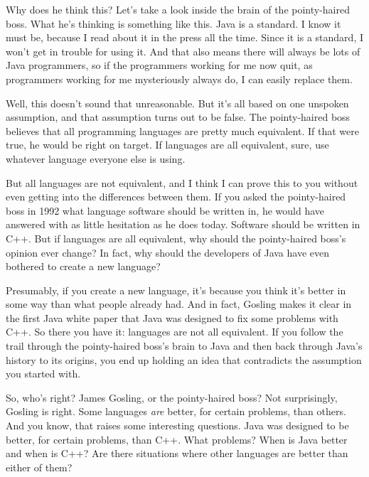 Why does he
                  think this? Let's take a look inside the brain of the
                  pointy-haired boss. What he's thinking is something like this.
                  Java is a standard. I know it must be, because I read about it
                  in the press all the time. Since it is a standard, I won't get
                  in trouble for using it. And that also means there will always
                  be lots of Java programmers, so if the programmers working for
                  me now quit, as programmers working for me mysteriously always
                  do, I can easily replace them.

Well, this doesn't
                  sound that unreasonable. But it's all based on one unspoken
                  assumption, and that assumption turns out to be false. The
                  pointy-haired boss believes that all programming languages are
                  pretty much equivalent. If that were true, he would be right
                  on target. If languages are all equivalent, sure, use whatever
                  language everyone else is using.

But all languages
                  are not equivalent, and I think I can prove this to you
                  without even getting into the differences between them. If you
                  asked the pointy-haired boss in 1992 what language software
                  should be written in, he would have answered with as little
                  hesitation as he does today. Software should be written in
                  C++. But if languages are all equivalent, why should the
                  pointy-haired boss's opinion ever change? In fact, why should
                  the developers of Java have even bothered to create a new
                  language?

Presumably, if you create a new language,
                  it's because you think it's better in some way than what
                  people already had. And in fact, Gosling makes it clear in the
                  first Java white paper that Java was designed to fix some
                  problems with C++. So there you have it: languages are not all
                  equivalent. If you follow the trail through the pointy-haired
                  boss's brain to Java and then back through Java's history to
                  its origins, you end up holding an idea that contradicts the
                  assumption you started with.

So, who's right? James
                  Gosling, or the pointy-haired boss? Not surprisingly, Gosling
                  is right. Some languages \emph{are} better, for certain
                  problems, than others. And you know, that raises some
                  interesting questions. Java was designed to be better, for
                  certain problems, than C++. What problems? When is Java better
                  and when is C++? Are there situations where other languages
                  are better than either of them?

